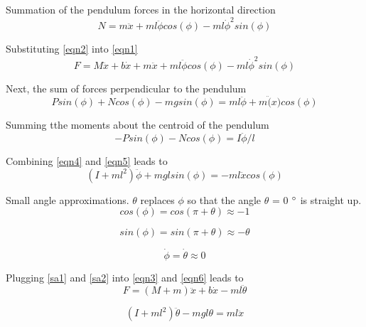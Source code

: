 \documentclass{article}
\begin{document}
Summation of the pendulum forces in the horizontal direction
\begin{equation} 
\label{eqn2}
N = m\ddot{x}+m l \ddot{\phi} cos(\phi)-m l \dot{\phi}^2sin(\phi)
\end{equation}

Substituting \ref{eqn2} into \ref{eqn1}
\begin{equation} 
\label{eqn3}
F = M\ddot{x}+b\dot{x} + m\ddot{x}+m l \ddot{\phi} cos(\phi)-m l \dot{\phi}^2sin(\phi)
\end{equation}

Next, the sum of forces perpendicular to the pendulum
\begin{equation} 
\label{eqn4}
Psin(\phi)+Ncos(\phi)-mgsin(\phi) = m l \ddot{\phi} + m\ddot(x)cos(\phi)
\end{equation}

Summing tthe moments about the centroid of the pendulum
\begin{equation} 
\label{eqn5}
-P sin(\phi)-N cos(\phi) = I \ddot{\phi}/l
\end{equation}

Combining \ref{eqn4} and \ref{eqn5} leads to 
\begin{equation} 
\label{eqn6}
(I+m l^2)\ddot{\phi} + m g lsin(\phi) = -m l \ddot{x} cos(\phi)
\end{equation}

Small angle approximations. $\theta$ \textrm{ replaces } $\phi$ \textrm{ so that the angle } $\theta$ \textrm{ = 0} $\degree$ \textrm{ is straight up}.
\\

\begin{equation} 
\label{sa1}
cos(\phi) = cos(\pi + \theta) \approx -1
\end{equation}

\begin{equation} 
\label{sa2}
sin(\phi) = sin(\pi + \theta) \approx -\theta
\end{equation}

\begin{equation} 
\label{sa3}
\dot{\phi} = \dot{\theta} \approx 0
\end{equation}

Plugging \ref{sa1} and \ref{sa2} into \ref{eqn3} and \ref{eqn6} leads to
\begin{equation} 
\label{eqn3b}
F = (M+m)\ddot{x}+b\dot{x} -m l \ddot{\theta}
\end{equation}

\begin{equation} 
\label{eqn6b}
(I+m l^2)\ddot{\theta} - m g l\theta = m l \ddot{x}
\end{equation}
\end{document}
